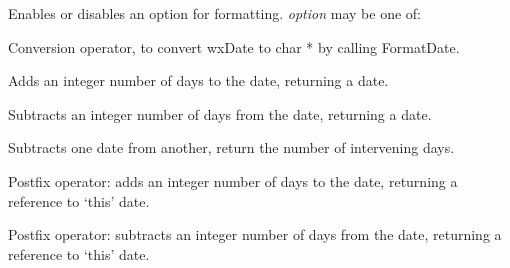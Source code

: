 

Enables or disables an option for formatting. {\it option} may be one of:

\begin{twocollist}\itemsep=0pt
\end{twocollist}



Conversion operator, to convert wxDate to char * by calling FormatDate.




Adds an integer number of days to the date, returning a date.




Subtracts an integer number of days from the date, returning a date.


Subtracts one date from another, return the number of intervening days.



Postfix operator: adds an integer number of days to the date, returning
a reference to `this' date.



Postfix operator: subtracts an integer number of days from the date, returning
a reference to `this' date.



